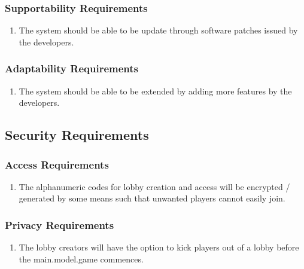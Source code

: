\documentclass[12pt, titlepage]{article}
\begin{document}
    \subsubsection{Supportability Requirements}
    \label{ssub:supportability_requirements}
    \begin{enumerate}[label=MS\arabic*.]
        \item The system should be able to be update through software patches issued by the developers.
    \end{enumerate}
    
    \subsubsection{Adaptability Requirements}
    \label{ssub:adaptability_requirements}
    \begin{enumerate}[label=MS\arabic*.]
        \item The system should be able to be extended by adding more features by the developers.
    \end{enumerate}
    

\subsection{Security Requirements}
    \subsubsection{Access Requirements}
    \label{ssub:access_requirements}
    \begin{enumerate}[label=SR\arabic*.]
        \item The alphanumeric codes for lobby creation and access will be encrypted / generated by some means such that unwanted players cannot easily join.
    \end{enumerate}
    
    \subsubsection{Privacy Requirements}
    \label{ssub:privacy_requirements}
    \begin{enumerate}[label=SR\arabic*.]
        \item The lobby creators will have the option to kick players out of a lobby before the main.model.game commences.
    \end{enumerate}
\end{document}

